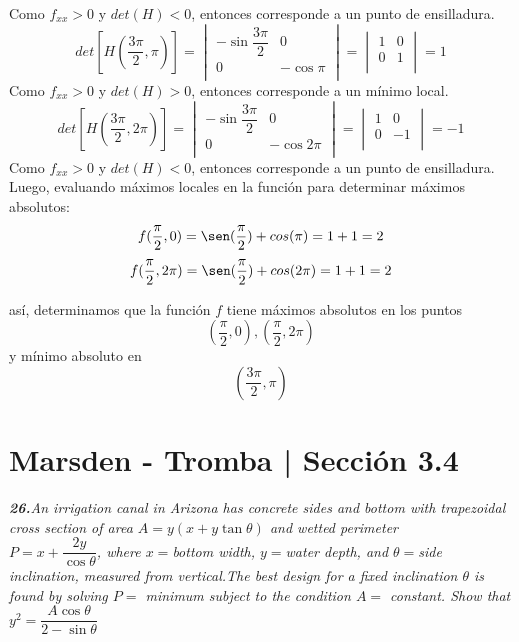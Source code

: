 \documentclass[a4paper,12pt]{article}
\begin{document}
		Como $f_{xx} > 0$ y $det(H) < 0$, entonces corresponde a un punto de ensilladura.\\
		$$det[H(\frac{3\pi}{2}, \pi)] =
			\begin{vmatrix}
				-\sin \dfrac{3\pi}{2} & 0 \\
				0  & - \cos \pi \\
			\end{vmatrix} =
			\begin{vmatrix}
				1 & 0 \\
				 0 & 1 \\
			\end{vmatrix} = 1$$
		Como $f_{xx} > 0$ y $det(H) > 0$, entonces corresponde a un mínimo local.\\
		$$det[H(\frac{3\pi}{2}, 2\pi)] =
			\begin{vmatrix}
				-\sin \dfrac{3\pi}{2} & 0 \\
				0  & - \cos 2\pi \\
			\end{vmatrix} =
			\begin{vmatrix}
				1 & 0 \\
				 0 & -1 \\
			\end{vmatrix} = -1$$
		Como $f_{xx} > 0$ y $det(H) < 0$, entonces corresponde a un punto de ensilladura.\\


		Luego, evaluando máximos locales en la función para determinar
		máximos absolutos:
			$$ f(\frac{\pi}{2}, 0) = \sen(\frac{\pi}{2}) + cos(\pi) = 1 + 1 = 2 $$
			$$ f(\frac{\pi}{2}, 2\pi) = \sen(\frac{\pi}{2}) + cos(2\pi) = 1 + 1 = 2$$

		así, determinamos que la función $f$ tiene máximos absolutos en los puntos
			$$(\frac{\pi}{2}, 0), (\frac{\pi}{2}, 2\pi)$$
		y mínimo absoluto en
			$$(\frac{3\pi}{2}, \pi)$$

	\section{Marsden - Tromba | Sección 3.4}
	\textit{\textbf{26.}An irrigation canal in Arizona has concrete sides and bottom with trapezoidal cross section of area
 $A = y(x + y \tan \theta)$ and wetted perimeter \\
 $P = x + \dfrac{2y}{\cos \theta}$, where $x = $bottom width, $y = $water depth, and $\theta =$side inclination, measured
 from vertical.The best design for a fixed inclination $\theta$ is found by solving $P =$ minimum subject to the condition
 $A =$ constant. Show that $y^2 =\dfrac{A \cos \theta}{2 - \sin \theta}$
}
\end{document}
